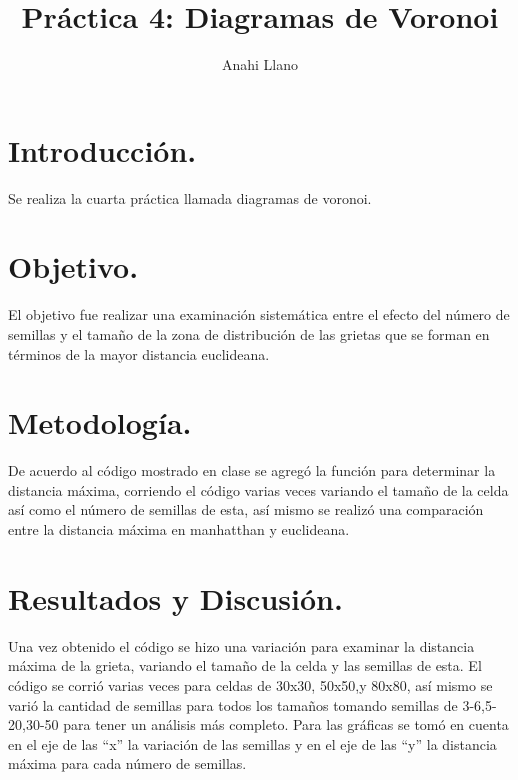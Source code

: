 \documentclass{article}
\title{Pr\'actica 4: Diagramas de Voronoi}
\author{Anahi Llano}
\begin{document}
\maketitle

\section{Introducci\'{o}n.}\label{into}

Se realiza la cuarta pr\'actica \cite{elisa} llamada diagramas de voronoi.

 \section{Objetivo.}\label{obj}

El objetivo fue realizar una examinaci\'on sistem\'atica entre el efecto del n\'umero de semillas y el tama\~no de la zona de distribuci\'on de las grietas que se forman en t\'erminos de la mayor distancia euclideana.


\section{Metodolog\'{i}a.}\label{met}

De acuerdo al c\'odigo mostrado en clase \citet{elisa1} se agreg\'o la funci\'on para determinar la distancia m\'axima, corriendo el c\'odigo varias veces variando el tama\~no de la celda as\'i como el n\'umero de semillas de esta, as\'i mismo se realiz\'o una comparaci\'on entre la distancia m\'axima en manhatthan y euclideana.

\section{Resultados y Discusi\'{o}n.}\label{res}

Una vez obtenido el c\'odigo\citep{ana} se hizo una variaci\'on para examinar la distancia m\'axima de la grieta, variando el tama\~no de la celda y las semillas de esta. 
El c\'odigo se corri\'o varias veces para celdas de 30x30, 50x50,y 80x80, as\'i mismo se vari\'o la cantidad de semillas para todos los tama\~nos tomando semillas de 3-6,5-20,30-50 para tener un an\'alisis m\'as completo.
Para las gr\'aficas se tom\'o en cuenta en el eje de las ``x''  la variaci\'on de las semillas y en el eje de las ``y''  la distancia m\'axima para cada n\'umero de semillas.
\end{document}
